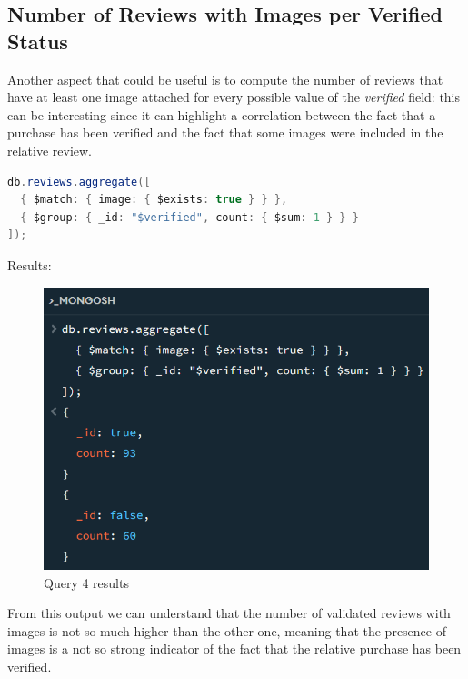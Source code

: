 \subsection{Number of Reviews with Images per Verified Status}
Another aspect that could be useful is to compute the number of reviews that have at least one image attached for every possible value of the \textit{verified} field: this can be interesting since it can highlight a correlation between the fact that a purchase has been verified and the fact that some images were included in the relative review. \\
\begin{lstlisting}[language=Java]
db.reviews.aggregate([
  { $match: { image: { $exists: true } } },
  { $group: { _id: "$verified", count: { $sum: 1 } } }
]);
\end{lstlisting}
Results:
\begin{figure}[H]
  \centering
  \includegraphics[scale=1]{Images/q4_result.png}
  \caption{Query 4 results}
  \label{fig:q4_result}
\end{figure}
From this output we can understand that the number of validated reviews with images is not so much higher than the other one, meaning that the presence of images is a not so strong indicator of the fact that the relative purchase has been verified. \\

